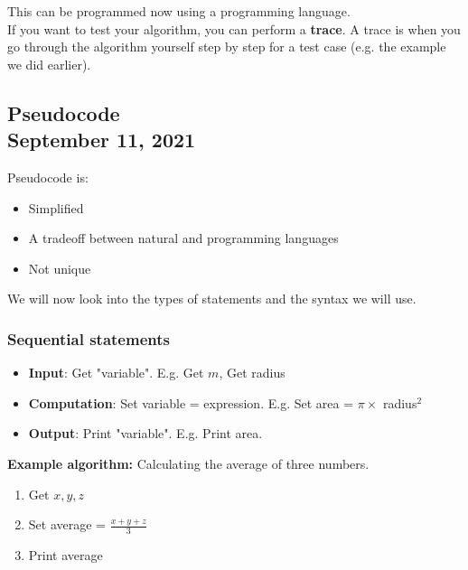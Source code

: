 \documentclass[]{article}
\begin{document}
\noindent This can be programmed now using a programming language.\\

\noindent If you want to test your algorithm, you can perform a \textbf{trace}. A trace is when you go through the algorithm yourself step by step for a test case (e.g. the example we did earlier).


\subsection{Pseudocode\\ {\normalfont September 11, 2021}}
\bigbreak

Pseudocode is:

\begin{itemize}
	\item Simplified
	\item A tradeoff between natural and programming languages
	\item Not unique\smallskip
\end{itemize}

\noindent We will now look into the types of statements and the syntax we will use.

\subsubsection{Sequential statements}
\bigbreak
\begin{itemize}
	\item \textbf{Input}: Get "variable". E.g. Get $m$, Get radius
	\item \textbf{Computation}: Set variable = expression. E.g. Set area = $\pi \times$ radius$^2$
	\item \textbf{Output}: Print "variable". E.g. Print area.\smallskip
\end{itemize}

\noindent \textbf{Example algorithm:} Calculating the average of three numbers.
\begin{enumerate}
	\item Get $x, y, z$
	\item Set average = $\frac{x + y + z}{3}$
	\item Print average \smallskip
\end{enumerate}
\end{document}
